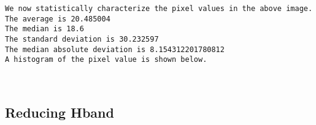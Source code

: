 \documentclass[11pt]{article}
\begin{document}
    \begin{Verbatim}[commandchars=\\\{\}]
We now statistically characterize the pixel values in the above image.
The average is 20.485004
The median is 18.6
The standard deviation is 30.232597
The median absolute deviation is 8.154312201780812
A histogram of the pixel value is shown below.
    \end{Verbatim}

    \begin{center}
    \end{center}
    { \hspace*{\fill} \\}
    
    \hypertarget{reducing-hband}{%
\subsection{Reducing Hband}\label{reducing-hband}}
\end{document}
